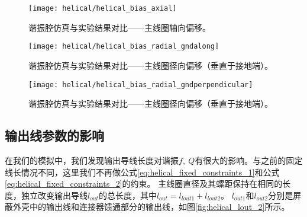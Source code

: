 \begin{figure}
    \centering
    \caption[谐振腔仿真与实验结果对比——主线圈轴向偏移]{谐振腔仿真与实验结果对比——主线圈轴向偏移。\label{fig:helical_bias_axial}}
    \texttt{[image: helical/helical\_bias\_axial]}
\end{figure}

\begin{figure}
    \centering
    \caption[谐振腔仿真与实验结果对比——主线圈径向偏移（垂直于接地端）]{谐振腔仿真与实验结果对比——主线圈径向偏移（垂直于接地端）。\label{fig:helical_bias_radial_gndalong}}
    \texttt{[image: helical/helical\_bias\_radial\_gndalong]}
\end{figure}

\begin{figure}
    \centering
    \caption[谐振腔仿真与实验结果对比——主线圈径向偏移（垂直于接地端）]{谐振腔仿真与实验结果对比——主线圈径向偏移（垂直于接地端）。\label{fig:helical_bias_radial_gndperpendicular}}
    \texttt{[image: helical/helical\_bias\_radial\_gndperpendicular]}
\end{figure}




\subsection[输出线参数的影响]{输出线参数的影响\label{section:helical_output_wire}}
在我们的模拟中，我们发现输出导线长度对谐振$f,\ Q$有很大的影响。与之前的固定线长情况不同，这里我们不再做公式\eqref{eq:helical_fixed_constraints_1}和公式\eqref{eq:helical_fixed_constraints_2}的约束。
主线圈直径及其螺距保持在相同的长度，独立改变输出导线$l_{out}$的总长度，其中$l_{out} = l_{lout1} + l_{lout2}$。
$l_{out1}$和$l_{out2}$分别是屏蔽外壳中的输出线和连接器馈通部分的输出线，如图\ref{fig:helical_lout_2}所示。


